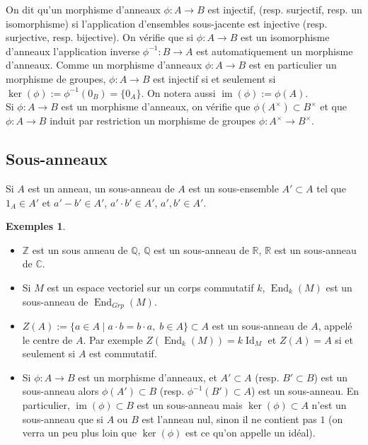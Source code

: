 \documentclass[a4paper, oneside, 12pt]{book}
\theoremstyle{theoremeStyle} %
\theoremstyle{definition} %
\newtheorem{exemples}[theoreme]{Exemples}
\DeclareMathOperator{\SEnd}{End}
\DeclareMathOperator{\im}{im}
\DeclareMathOperator{\Id}{Id}
\newcommand{\Q}{\mathbb{Q}}
\newcommand{\CC}{\mathbb{C}}
\newcommand{\Z}{\mathbb{Z}}
\newcommand{\R}{\mathbb{R}}
\begin{document}
On dit qu'un morphisme d'anneaux $\phi:A\rightarrow B$ est injectif, (resp. surjectif, resp. un isomorphisme) si l'application d'ensembles sous-jacente est injective (resp. surjective, resp. bijective). On vérifie que si $\phi:A\rightarrow B$ est un isomorphisme d'anneaux l'application inverse $\phi^{-1}:B\rightarrow A$ est automatiquement un morphisme d'anneaux. Comme un morphisme d'anneaux $\phi:A\rightarrow B$ est en particulier un morphisme de groupes, $\phi:A\rightarrow B$ est injectif si et seulement si $\ker(\phi):=\phi^{-1}(0_B)=\lbrace 0_A\rbrace$. On notera aussi $\im(\phi):=\phi(A)$. \\

 Si $\phi:A\rightarrow B$ est un morphisme d'anneaux, on vérifie que $\phi(A^\times)\subset B^\times$ et que $\phi:A\rightarrow B$ induit par restriction un morphisme de groupes $\phi:A^\times\rightarrow B^\times$.

\subsection{Sous-anneaux}Si $A$ est un anneau, un sous-anneau de $A$ est un sous-ensemble $A'\subset A$ tel que $1_A\in A'$ et $a'-b'\in A'$, $a'\cdot b'\in A'$, $a',b'\in A'$. \\

\begin{exemples}\begin{itemize}[leftmargin=* ,parsep=0cm,itemsep=0cm,topsep=0cm]
\item $\Z$ est un sous anneau de $\Q$, $\Q$ est un sous-anneau de $\R$, $\R$ est un sous-anneau de $\CC$.
\item Si $M$ est un espace vectoriel sur un corps commutatif $k$, $\SEnd_k(M)$ est un sous-anneau de $\SEnd_{Grp}(M)$.
\item $Z(A):=\lbrace a\in A\;|\; a\cdot b=b\cdot a,\; b\in A\rbrace\subset A$ est un sous-anneau de $A$, appelé le centre de $A$. Par exemple $Z(\SEnd_k(M))=k\Id_M$ et $Z(A)=A$ si et seulement si $A$ est commutatif.
\item Si $\phi:A\rightarrow B$ est un morphisme d'anneaux, et $A'\subset A$ (resp. $B'\subset B$) est un sous-anneau alors $\phi(A')\subset B$ (resp. $\phi^{-1}(B')\subset A$) est un sous-anneau. En particulier, $\im(\phi)\subset B$ est un sous-anneau mais  $\ker(\phi)\subset A$ n'est un sous-anneau que si $A$ ou $B$ est l'anneau nul, sinon il ne contient pas $1$ (on verra un peu plus loin que $\ker(\phi)$ est ce qu'on appelle un idéal).
\end{itemize}
\end{exemples}
\end{document}
